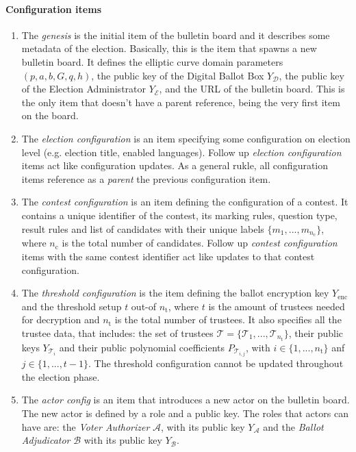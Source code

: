 \paragraph{Configuration items}
\begin{enumerate}
    \item The \textit{genesis} is the initial item of the bulletin board and it describes some metadata of the election. Basically, this is the item that spawns a new bulletin board. It defines the elliptic curve domain parameters $(p, a, b, G, q, h)$, the public key of the Digital Ballot Box $Y_\mathcal{D}$, the public key of the Election Administrator $Y_\mathcal{E}$, and the URL of the bulletin board. This is the only item that doesn't have a parent reference, being the very first item on the board.
    
    \item The \textit{election configuration} is an item specifying some configuration on election level (e.g. election title, enabled languages). Follow up \textit{election configuration} items act like configuration updates. As a general rukle, all configuration items reference as a \textit{parent} the previous configuration item. 
    
    \item The \textit{contest configuration} is an item defining the configuration of a contest. It contains a unique identifier of the contest, its marking rules, question type, result rules and list of candidates with their unique labels $\{m_1, ..., m_{n_\mathrm{c}}\}$, where $n_\mathrm{c}$ is the total number of candidates. Follow up \textit{contest configuration} items with the same contest identifier act like updates to that contest configuration.
    
    \item The \textit{threshold configuration} is the item defining the ballot encryption key $Y_\mathrm{enc}$ and the threshold setup $t$ out-of $n_\mathrm{t}$, where $t$ is the amount of trustees needed for decryption and $n_\mathrm{t}$ is the total number of trustees. It also specifies all the trustee data, that includes: the set of trustees $\boldsymbol{\mathcal{T}} = \{\mathcal{T}_1, ..., \mathcal{T}_{n_\mathrm{t}}\}$, their public keys $Y_{\mathcal{T}_i}$ and their public polynomial coefficients $P_{\mathcal{T}_{i,j}}$, with $i \in \{1, ..., n_\mathrm{t}\}$ anf $j \in \{1, ..., t-1\}$. The threshold configuration cannot be updated throughout the election phase.
    
    \item The \textit{actor config} is an item that introduces a new actor on the bulletin board. The new actor is defined by a role and a public key. The roles that actors can have are: the \textit{Voter Authorizer} $\mathcal{A}$, with its public key $Y_\mathcal{A}$ and the \textit{Ballot Adjudicator} $\mathcal{B}$ with its public key $Y_\mathcal{B}$.


\end{enumerate}
